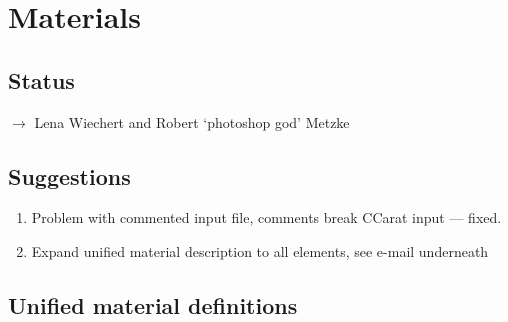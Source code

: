 



\chapter{Materials}


\section{Status}
$\to$ Lena Wiechert and Robert `photoshop god' Metzke

\section{Suggestions}
\begin{enumerate}
\item Problem with commented input file, comments break CCarat input ---
  fixed.
\item Expand unified material description to all elements, see e-mail
  underneath 
\end{enumerate}

\section{Unified material definitions}

